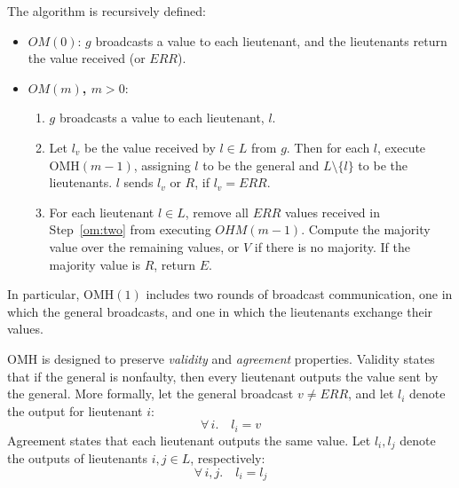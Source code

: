 \documentclass{llncs/llncs}
\newcommand{\OMH}{\ensuremath{\mathrm{OMH}}}
\begin{document}

The algorithm is recursively defined:

\begin{itemize}
\item {\bf $OM(0)$}: $g$ broadcasts a value to each lieutenant, and the lieutenants return the value received (or $ERR$).
\item {\bf $OM(m)$, $m > 0$}:
  \begin{enumerate}
  \item $g$ broadcasts a value to each lieutenant, $l$.
  \item\label{om:two} Let $l_v$ be the value received by $l \in L$ from $g$. Then for each $l$, execute $\OMH(m-1)$, assigning $l$ to be the general and $L \setminus \{l\}$ to be the lieutenants. $l$ sends $l_v$ or $R$, if $l_v = ERR$.
  \item For each lieutenant $l \in L$, remove all $ERR$ values received in Step~\ref{om:two} from executing $OHM(m-1)$. Compute the majority value over the remaining values, or $V$ if there is no majority. If the majority value is $R$, return $E$.
  \end{enumerate}
\end{itemize}

\noindent
In particular, $\OMH(1)$ includes two rounds of broadcast communication, one in which the general broadcasts, and one in which the lieutenants exchange their values.

$\OMH$ is designed to preserve \emph{validity} and \emph{agreement}
properties. Validity states that if the general is nonfaulty, then every lieutenant outputs the value sent by the general. More formally, let the general broadcast $v \neq ERR$, and let $l_i$ denote the output for lieutenant $i$:
%
\begin{equation}
  \tag{Validity}
    \forall \,i. \quad l_i = v
\end{equation}
%
Agreement states that each lieutenant outputs the same value. Let $l_i, l_j$ denote the outputs of lieutenants $i, j \in L$, respectively:
%
\begin{equation}
  \tag{Agreement}
    \forall \,i, j. \quad l_i = l_j
\end{equation}
%
\end{document}
